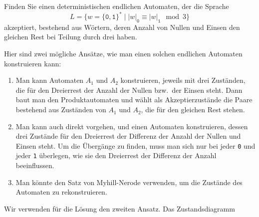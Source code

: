 Finden Sie einen deterministischen endlichen Automaten, der
die Sprache
\[
L
=
\{
w = \{\texttt{0},\texttt{1}\}^*
\mid
|w|_{\texttt{0}}
\equiv
|w|_{\texttt{1}}
\mod 3
\}
\]
akzeptiert,
bestehend aus Wörtern, deren Anzahl von Nullen und Einsen den 
gleichen Rest bei Teilung durch drei haben.


\begin{loesung}
Hier sind zwei mögliche Ansätze, wie man einen solchen endlichen
Automaten konstruieren kann:
\begin{enumerate}
\item
Man kann Automaten $A_1$ und $A_2$ konstruieren, jeweils mit drei Zuständen,
die für den Dreierrest der Anzahl der Nullen bzw.~der Einsen steht.
Dann baut man den Produktautomaten und wählt als Akzeptierzustände
die Paare bestehend aus Zuständen von $A_1$ und $A_2$, die für den gleichen
Rest stehen.
\item
Man kann auch direkt vorgehen, und einen Automaten konstruieren,
dessen drei Zustände für den Dreierrest der Differenz der Anzahl der
Nullen und Einsen steht.
Um die Übergänge zu finden, muss man sich nur bei jeder \texttt{0} und
jeder \texttt{1} überlegen, wie sie den Dreierrest der Differenz der
Anzahl beeinflussen.
\item
Man könnte den Satz von Myhill-Nerode verwenden, um die Zustände des
Automaten zu rekonstruieren.
\end{enumerate}
Wir verwenden für die Lösung den zweiten Ansatz.
Das Zustandsdiagramm 
\begin{center}
\end{center}
\end{loesung}
